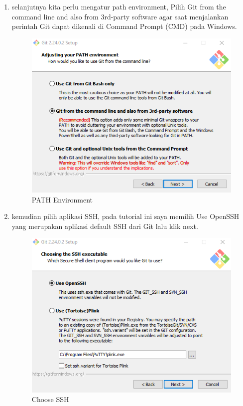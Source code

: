 \begin{enumerate}
\item selanjutnya kita perlu mengatur path environment, Pilih Git from the command line and also from 3rd-party software agar saat menjalankan perintah Git dapat dikenali di Command Prompt (CMD) pada Windows.
\begin{figure}[H]
\centering
\includegraphics[scale=.5]{figures/install_git6}
\caption{PATH Environment}
\label{install_git6}
\end{figure}

\item kemudian pilih aplikasi SSH, pada tutorial ini saya memilih Use OpenSSH yang merupakan aplikasi default SSH dari Git lalu klik next.
\begin{figure}[H]
\centering
\includegraphics[scale=.5]{figures/install_git7}
\caption{Choose SSH}
\label{install_git7}
\end{figure}


\end{enumerate}
